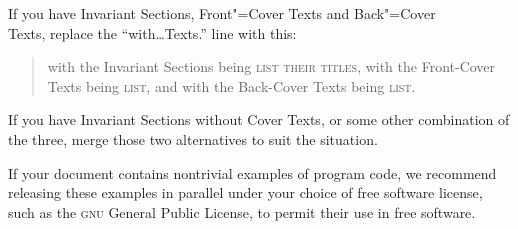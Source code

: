 If you have Invariant Sections, Front"=Co\-ver Texts and Back"=Co\-ver \\
Texts, replace the ``with\ldots Texts.'' line with this:

{\small\begin{quotation}
	with the Invariant Sections being \textsc{list their titles}, with
	the Front-Cover Texts being \textsc{list}, and with the Back-Cover
	Texts being \textsc{list}.
\end{quotation}}

If you have Invariant Sections without Cover Texts, or some other
combination of the three, merge those two alternatives to suit the
situation.

If your document contains nontrivial examples of program code, we recommend
releasing these examples in parallel under your choice of free software
license, such as the \textsc{gnu} General Public License, to permit their
use in free software.
